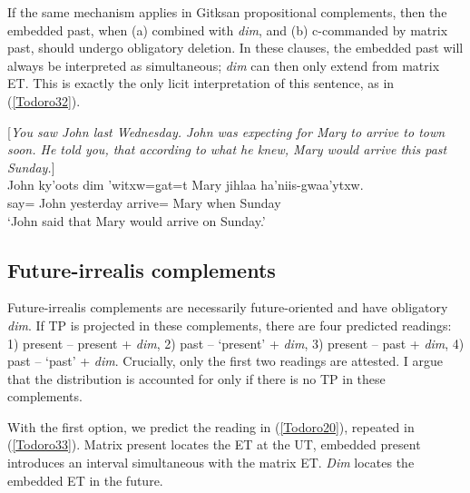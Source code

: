 \documentclass[output=paper]{langscibook}
\begin{document}
If the same mechanism applies in Gitksan propositional complements, then the embedded past, when (a) combined with \emph{dim}, and (b) c-commanded by matrix past, should undergo obligatory deletion. In these clauses, the embedded past will always be interpreted as simultaneous; \emph{dim} can then only extend from matrix ET. This is exactly the only licit interpretation of this sentence, as in (\ref{Todoro32}).  

\begin{exe}
\ex \label{Todoro32}
\begin{xlist}

\ex \label{Todoro32a} [\emph{You saw John last Wednesday. John was expecting for Mary to arrive to town soon. He told you, that according to what he knew, Mary would arrive this past Sunday.}]\\
    {John} {ky'oots}  {dim} {'witxw=g̱at=t} {Mary} {jihlaa} {ha'niis-gwaa'ytxw}. \\
    say= John yesterday  arrive= Mary when Sunday\\
\glt ‘John said that Mary would arrive on Sunday.’ 

\ex \label{Todoro32b}

\end{xlist}
\end{exe}

\subsection{Future-irrealis complements}\label{Todoro:sect4.2}

Future-irrealis complements are necessarily future-oriented and have obligatory \emph{dim}. If %
TP is projected in these complements, there are four predicted readings: 1) present – present + \emph{dim}, 2) past – ‘present’ + \emph{dim}, 3) present – past + \emph{dim}, 4) past – ‘past’ + \emph{dim}. Crucially, only the first two readings are attested. I argue that the distribution is accounted for only if there is no TP 
in these complements.

With the first option, we predict the reading in (\ref{Todoro20}), repeated in (\ref{Todoro33}). Matrix present locates the ET at the UT, embedded present introduces an interval simultaneous with the matrix ET. \emph{Dim} locates the embedded ET in the future.
\end{document}

